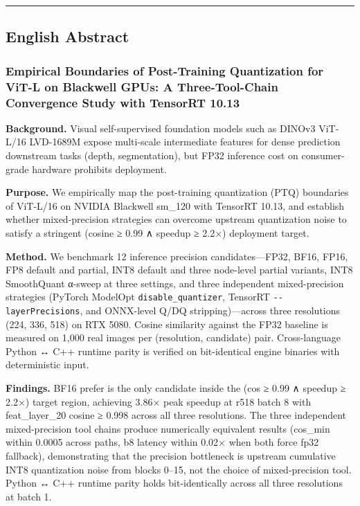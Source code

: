 \documentclass[
]{article}
\begin{document}
\begin{center}\rule{0.5\linewidth}{0.5pt}\end{center}

\subsection{English Abstract}\label{english-abstract}

\subsubsection{Empirical Boundaries of Post-Training Quantization for
ViT-L on Blackwell GPUs: A Three-Tool-Chain Convergence Study with
TensorRT
10.13}\label{empirical-boundaries-of-post-training-quantization-for-vit-l-on-blackwell-gpus-a-three-tool-chain-convergence-study-with-tensorrt-10.13-1}

\textbf{Background.} Visual self-supervised foundation models such as
DINOv3 ViT-L/16 LVD-1689M expose multi-scale intermediate features for
dense prediction downstream tasks (depth, segmentation), but FP32
inference cost on consumer-grade hardware prohibits deployment.

\textbf{Purpose.} We empirically map the post-training quantization
(PTQ) boundaries of ViT-L/16 on NVIDIA Blackwell sm\_120 with TensorRT
10.13, and establish whether mixed-precision strategies can overcome
upstream quantization noise to satisfy a stringent (cosine ≥ 0.99 ∧
speedup ≥ 2.2×) deployment target.

\textbf{Method.} We benchmark 12 inference precision candidates---FP32,
BF16, FP16, FP8 default and partial, INT8 default and three node-level
partial variants, INT8 SmoothQuant α-sweep at three settings, and three
independent mixed-precision strategies (PyTorch ModelOpt
\texttt{disable\_quantizer}, TensorRT \texttt{-\/-layerPrecisions}, and
ONNX-level Q/DQ stripping)---across three resolutions (224, 336, 518) on
RTX 5080. Cosine similarity against the FP32 baseline is measured on
1,000 real images per (resolution, candidate) pair. Cross-language
Python ↔ C++ runtime parity is verified on bit-identical engine binaries
with deterministic input.

\textbf{Findings.} BF16 prefer is the only candidate inside the (cos ≥
0.99 ∧ speedup ≥ 2.2×) target region, achieving 3.86× peak speedup at
r518 batch 8 with feat\_layer\_20 cosine ≥ 0.998 across all three
resolutions. The three independent mixed-precision tool chains produce
numerically equivalent results (cos\_min within 0.0005 across paths, b8
latency within 0.02× when both force fp32 fallback), demonstrating that
the precision bottleneck is upstream cumulative INT8 quantization noise
from blocks 0--15, not the choice of mixed-precision tool. Python ↔ C++
runtime parity holds bit-identically across all three resolutions at
batch 1.
\end{document}
